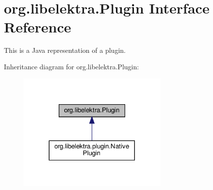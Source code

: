 \hypertarget{interfaceorg_1_1libelektra_1_1Plugin}{}\section{org.\+libelektra.\+Plugin Interface Reference}
\label{interfaceorg_1_1libelektra_1_1Plugin}


This is a Java representation of a plugin.  




Inheritance diagram for org.\+libelektra.\+Plugin\+:
\nopagebreak
\begin{figure}[H]
\begin{center}
\leavevmode
\includegraphics[width=212pt]{interfaceorg_1_1libelektra_1_1Plugin__inherit__graph}
\end{center}
\end{figure}
